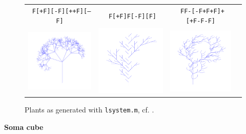 \documentclass{beamer}
\def\sect#1{\textbf{\color{blue} #1}}
\begin{document}
\begin{frame}[t]{}
\begin{multicols}{5}
\begin{figure}
\begin{tabular}{cccc}
\footnotesize\texttt{
F[+F][-F][++F][--F]} & 
\footnotesize\texttt{
F[+F]F[-F][F]} &
\footnotesize\texttt{
FF-[-F+F+F]+[+F-F-F]} \\
\includegraphics[width=0.3\hsize]{lsystem1} & 
\includegraphics[width=0.3\hsize]{lsystem2} & 
\includegraphics[width=0.3\hsize]{lsystem3} & 
\end{tabular}
\caption{Plants as generated with \texttt{lsystem.m}, cf. \cite{matlabguide}.}
\end{figure}
\medskip

\sect{Soma cube}


\end{multicols}
\end{frame}
\end{document}
